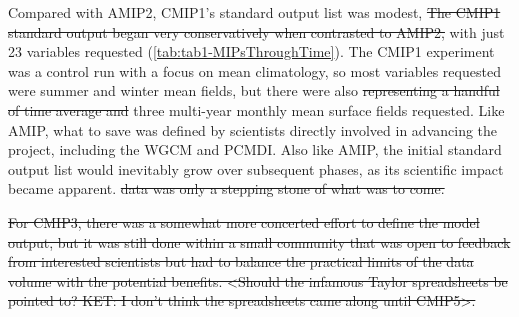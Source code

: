 \documentclass[gmd, preprint]{copernicus}
\begin{document}
{\color{blue}Compared with AMIP2, CMIP1's standard output list was modest, }\sout{The CMIP1 standard output began very conservatively when contrasted to AMIP2,} with just 23 variables requested (\autoref{tab:tab1-MIPsThroughTime}).  {\color{blue} The CMIP1 experiment was a control run with a focus on mean climatology, so most variables requested were summer and winter mean fields, but there were also} \sout{representing a handful of time average and} three multi-year monthly mean surface fields requested. Like AMIP, what to save was defined by scientists directly involved in advancing the project, including the WGCM and PCMDI. Also like AMIP, the initial standard output list would inevitably grow over subsequent phases, as its scientific impact became apparent. \sout{data was only a stepping stone of what was to come.}  

\sout{For CMIP3, there was a somewhat more concerted effort to define the model output, but it was still done within a small community that was open to feedback from interested scientists but had to balance the practical limits of the data volume with the potential benefits. <Should the infamous Taylor spreadsheets be pointed to? KET: I don't think the spreadsheets came along until CMIP5>.}
\end{document}
